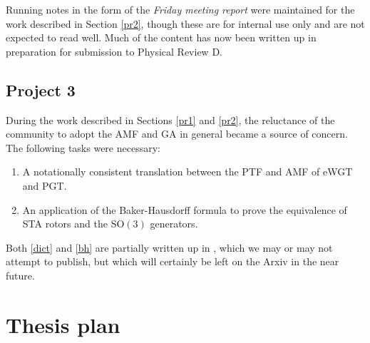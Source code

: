 \documentclass[twoside]{report}
\begin{document}
\begin{multicols}{2}
Running notes in the form of the \textit{Friday meeting report} \cite{fmr} were maintained for the work described in Section \ref{pr2}, though these are for internal use only and are not expected to read well. Much of the content has now been written up \cite{paper-2} in preparation for submission to Physical Review D.
\subsection{Project 3}\label{pr3}
During the work described in Sections \ref{pr1} and \ref{pr2}, the reluctance of the community to adopt the AMF and GA in general became a source of concern. The following tasks were necessary:
\begin{enumerate}[resume]
  \item\label{dict} A notationally consistent translation between the PTF and AMF of eWGT and PGT.
  \item\label{bh} An application of the Baker-Hausdorff formula to prove the equivalence of STA rotors and the $\mathrm{SO}(3)$ generators.
\end{enumerate}
Both \ref{dict} and \ref{bh} are partially written up in \cite{dictionary}, which we may or may not attempt to publish, but which will certainly be left on the Arxiv in the near future.
\section{Thesis plan}\label{plan}

\end{multicols}
\end{document}
